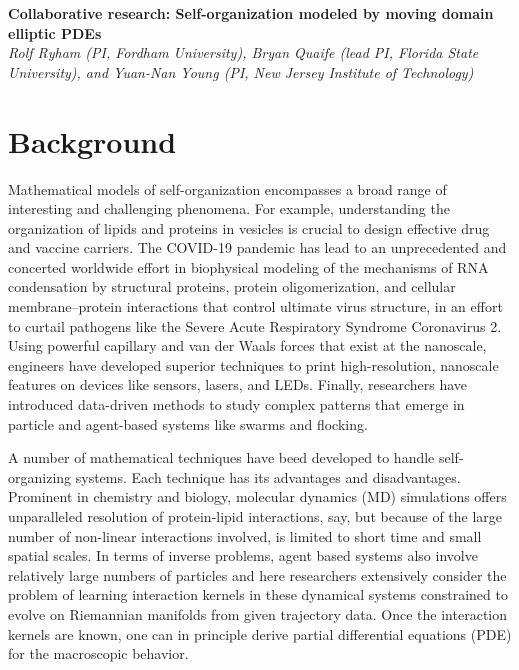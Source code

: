 \noindent
{\bf Collaborative research: Self-organization modeled by moving domain
elliptic PDEs} \\
{\em Rolf Ryham (PI, Fordham University),
Bryan Quaife (lead PI, Florida State University), and
Yuan-Nan Young (PI, New Jersey Institute of Technology)}

\section{Background}
\label{sec:background}

Mathematical models of self-organization encompasses a
broad range of interesting and challenging phenomena.
For example, understanding the organization of lipids and proteins in vesicles
is crucial to design effective drug and vaccine carriers.
The COVID-19 pandemic has lead to an unprecedented and concerted worldwide
effort in biophysical modeling of the mechanisms of RNA condensation
by structural proteins, protein oligomerization, and cellular
membrane–protein interactions that control ultimate virus structure,
in an effort to curtail pathogens like the Severe Acute Respiratory Syndrome Coronavirus 2.
Using powerful capillary and van der Waals forces that exist at the nanoscale, engineers
have developed superior techniques to print 
high-resolution, nanoscale features on devices like sensors, lasers, and LEDs.
Finally, researchers have introduced data-driven methods 
to study complex patterns that emerge in particle and agent-based systems like swarms
and flocking.

A number of mathematical techniques have beed developed to handle
self-organizing systems.  Each technique has its advantages and disadvantages.
Prominent in chemistry and biology, molecular
dynamics (MD) simulations offers unparalleled resolution of protein-lipid interactions,
say, but because of the large number of non-linear interactions involved,
is limited to short time and small spatial scales.
In terms of inverse problems,
agent based systems also involve relatively large numbers of particles
and here researchers extensively consider the problem  
of learning interaction kernels in these dynamical systems
constrained to evolve on Riemannian manifolds from given trajectory data.
Once the interaction kernels are known, one can in principle derive
partial differential equations (PDE) for the macroscopic behavior. 


